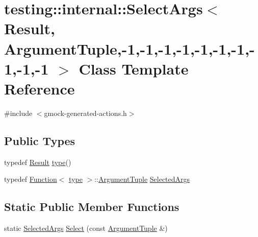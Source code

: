\hypertarget{classtesting_1_1internal_1_1_select_args_3_01_result_00_01_argument_tuple_00-1_00-1_00-1_00-1_005f626e5adb9246c46f665dbb755b50f6}{}\section{testing\+:\+:internal\+:\+:Select\+Args$<$ Result, Argument\+Tuple,-\/1,-\/1,-\/1,-\/1,-\/1,-\/1,-\/1,-\/1,-\/1,-\/1 $>$ Class Template Reference}
\label{classtesting_1_1internal_1_1_select_args_3_01_result_00_01_argument_tuple_00-1_00-1_00-1_00-1_005f626e5adb9246c46f665dbb755b50f6}


{\ttfamily \#include $<$gmock-\/generated-\/actions.\+h$>$}

\subsection*{Public Types}
\begin{DoxyCompactItemize}
\item 
typedef \hyperlink{typedefs__d_8js_a28287671eaf7406afd604bd055ba4066}{Result} \hyperlink{classtesting_1_1internal_1_1_select_args_3_01_result_00_01_argument_tuple_00-1_00-1_00-1_00-1_005f626e5adb9246c46f665dbb755b50f6_ac0cd24f2f3bd5f52b1a864e4dd380322}{type}()
\item 
typedef \hyperlink{structtesting_1_1internal_1_1_function}{Function}$<$ \hyperlink{classtesting_1_1internal_1_1_select_args_3_01_result_00_01_argument_tuple_00-1_00-1_00-1_00-1_005f626e5adb9246c46f665dbb755b50f6_ac0cd24f2f3bd5f52b1a864e4dd380322}{type} $>$\+::\hyperlink{typedefs__d_8js_a396b2bdc7ef45f482a7e9254b15c3c01}{Argument\+Tuple} \hyperlink{classtesting_1_1internal_1_1_select_args_3_01_result_00_01_argument_tuple_00-1_00-1_00-1_00-1_005f626e5adb9246c46f665dbb755b50f6_adc60d51fe96e09fd5e41b2a61f998c54}{Selected\+Args}
\end{DoxyCompactItemize}
\subsection*{Static Public Member Functions}
\begin{DoxyCompactItemize}
\item 
static \hyperlink{classtesting_1_1internal_1_1_select_args_3_01_result_00_01_argument_tuple_00-1_00-1_00-1_00-1_005f626e5adb9246c46f665dbb755b50f6_adc60d51fe96e09fd5e41b2a61f998c54}{Selected\+Args} \hyperlink{classtesting_1_1internal_1_1_select_args_3_01_result_00_01_argument_tuple_00-1_00-1_00-1_00-1_005f626e5adb9246c46f665dbb755b50f6_a909bc989f5f80ecd5fcab22899b1e121}{Select} (const \hyperlink{typedefs__d_8js_a396b2bdc7ef45f482a7e9254b15c3c01}{Argument\+Tuple} \&)
\end{DoxyCompactItemize}


